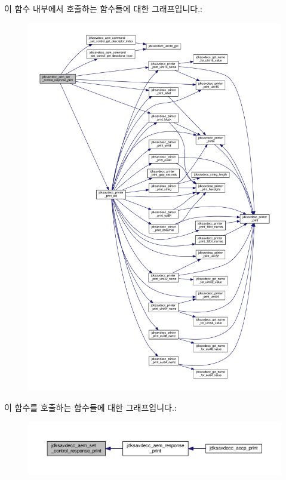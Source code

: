 이 함수 내부에서 호출하는 함수들에 대한 그래프입니다.\+:
\nopagebreak
\begin{figure}[H]
\begin{center}
\leavevmode
\includegraphics[width=350pt]{group__aem__print_ga8ed15b2b67bfa68a7f5bebbdddc305f6_cgraph}
\end{center}
\end{figure}




이 함수를 호출하는 함수들에 대한 그래프입니다.\+:
\nopagebreak
\begin{figure}[H]
\begin{center}
\leavevmode
\includegraphics[width=350pt]{group__aem__print_ga8ed15b2b67bfa68a7f5bebbdddc305f6_icgraph}
\end{center}
\end{figure}


